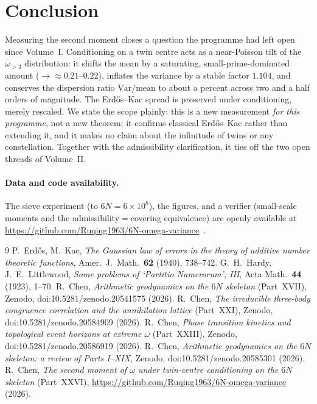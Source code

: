 \documentclass[11pt,a4paper]{article}
\theoremstyle{remark}\newtheorem{remark}{Remark}
\begin{document}
\section{Conclusion}
Measuring the second moment closes a question the programme had left open since
Volume~I. Conditioning on a twin centre acts as a near-Poisson tilt of the
$\omega_{>3}$ distribution: it shifts the mean by a saturating, small-prime-dominated
amount ($\to\approx0.21$--$0.22$), inflates the variance by a stable factor $1.104$,
and conserves the dispersion ratio $\mathrm{Var}/\mathrm{mean}$ to about a percent
across two and a half orders of magnitude. The Erd\H{o}s--Kac spread is preserved
under conditioning, merely rescaled. We state the scope plainly: this is a new
measurement \emph{for this programme}, not a new theorem; it confirms classical
Erd\H{o}s--Kac rather than extending it, and it makes no claim about the infinitude
of twins or any constellation. Together with the admissibility clarification, it
ties off the two open threads of Volume~II.

\paragraph{Data and code availability.}
The sieve experiment (to $6N=6\times10^8$), the figures, and a verifier (small-scale
moments and the admissibility$=$covering equivalence) are openly available at
\url{https://github.com/Ruqing1963/6N-omega-variance}~\cite{repo}.

\begin{thebibliography}{9}
 P.~Erd\H{o}s, M.~Kac, \emph{The Gaussian law of errors in the
theory of additive number theoretic functions}, Amer.\ J.\ Math.\ \textbf{62}
(1940), 738--742.
 G.~H.~Hardy, J.~E.~Littlewood, \emph{Some problems of `Partitio
Numerorum'; III}, Acta Math.\ \textbf{44} (1923), 1--70.
 R.~Chen, \emph{Arithmetic geodynamics on the $6N$ skeleton}
(Part~XVII), Zenodo, doi:10.5281/zenodo.20541575 (2026).
 R.~Chen, \emph{The irreducible three-body congruence correlation
and the annihilation lattice} (Part~XXI), Zenodo, doi:10.5281/zenodo.20584909 (2026).
 R.~Chen, \emph{Phase transition kinetics and topological event
horizons at extreme $\omega$} (Part~XXIII), Zenodo, doi:10.5281/zenodo.20586919 (2026).
 R.~Chen, \emph{Arithmetic geodynamics on the $6N$ skeleton: a
review of Parts I--XIX}, Zenodo, doi:10.5281/zenodo.20585301 (2026).
 R.~Chen, \emph{The second moment of $\omega$ under twin-centre
conditioning on the $6N$ skeleton} (Part~XXVI),
\url{https://github.com/Ruqing1963/6N-omega-variance} (2026).
\end{thebibliography}
\end{document}
